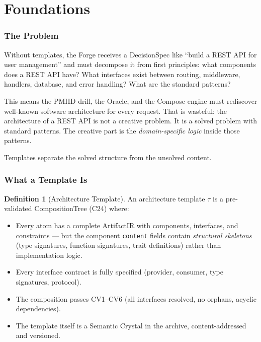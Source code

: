 \documentclass[11pt,a4paper,twoside]{article}
\theoremstyle{definition}
\newtheorem{definition}{Definition}[section]
\theoremstyle{plain}
\theoremstyle{remark}
\begin{document}
\tableofcontents
\newpage


\part{Foundations}\label{part:foundations}

\section{The Problem}\label{sec:problem}

Without templates, the Forge receives a DecisionSpec like ``build a
REST API for user management'' and must decompose it from first
principles: what components does a REST API have? What interfaces
exist between routing, middleware, handlers, database, and error
handling? What are the standard patterns?

This means the PMHD drill, the Oracle, and the Compose engine must
rediscover well-known software architecture for every request. That
is wasteful: the architecture of a REST API is not a creative
problem. It is a solved problem with standard patterns. The creative
part is the \emph{domain-specific logic} inside those patterns.

Templates separate the solved structure from the unsolved content.

\section{What a Template Is}\label{sec:whatis}

\begin{definition}[Architecture Template]\label{def:template}
An architecture template $\tau$ is a pre-validated CompositionTree
(C24) where:
\begin{itemize}[nosep]
  \item Every atom has a complete ArtifactIR with components,
        interfaces, and constraints — but the component
        \texttt{content} fields contain \emph{structural skeletons}
        (type signatures, function signatures, trait definitions)
        rather than implementation logic.
  \item Every interface contract is fully specified (provider,
        consumer, type signatures, protocol).
  \item The composition passes CV1--CV6 (all interfaces resolved,
        no orphans, acyclic dependencies).
  \item The template itself is a Semantic Crystal in the archive,
        content-addressed and versioned.
\end{itemize}
\end{definition}
\end{document}
